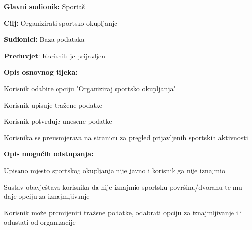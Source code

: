 					\noindent {}
					\begin{packed_item}
						
						\item \textbf{Glavni sudionik: }Sportaš
						\item  \textbf{Cilj:} Organizirati sportsko okupljanje
						\item  \textbf{Sudionici:} Baza podataka
						\item  \textbf{Preduvjet:} Korisnik je prijavljen
						\item  \textbf{Opis osnovnog tijeka:}
						
						\item[] \begin{packed_enum}
							
							\item Korisnik odabire opciju "Organiziraj sportsko okupljanja"
							\item Korisnik upisuje tražene podatke
							\item Korisnik potvrđuje unesene podatke
							\item Korisnika se preusmjerava na stranicu za pregled prijavljenih sportskih aktivnosti
						\end{packed_enum}
						
						\item  \textbf{Opis mogućih odstupanja:}
						
						\item[] \begin{packed_item}
							
							\item[2.a] Upisano mjesto sportskog okupljanja nije javno i korisnik ga nije iznajmio
							\item[] \begin{packed_enum}
								
								\item Sustav obavještava korisnika da nije iznajmio sportsku površinu/dvoranu te mu daje opciju za iznajmljivanje
								\item Korisnik može promijeniti tražene podatke, odabrati opciju za iznajmljivanje ili odustati od organizacije
								
							\end{packed_enum}
							
						\end{packed_item}
					\end{packed_item}
					
